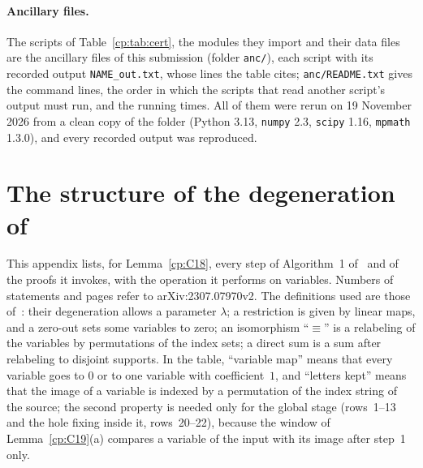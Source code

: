 \documentclass[11pt]{article}
\theoremstyle{definition}
\theoremstyle{remark}
\begin{document}
\paragraph{Ancillary files.} The scripts of Table~\ref{cp:tab:cert}, the modules they import and their data files are the ancillary files of this submission (folder \texttt{anc/}), each script with its recorded output \texttt{NAME\_\allowbreak{}out.\allowbreak{}txt}, whose lines the table cites; \texttt{anc/README.\allowbreak{}txt} gives the command lines, the order in which the scripts that read another script's output must run, and the running times. All of them were rerun on 19 November 2026 from a clean copy of the folder (Python 3.13, \texttt{numpy} 2.3, \texttt{scipy} 1.16, \texttt{mpmath} 1.3.0), and every recorded output was reproduced.

\appendix
\section{The structure of the degeneration of~\texorpdfstring{\cite{VXXZ24}}{VXXZ24}}\label{cp:app:vxxz}

This appendix lists, for Lemma~\ref{cp:C18}, every step of Algorithm~1 of~\cite{VXXZ24} and of the proofs it invokes, with the operation it performs on variables. Numbers of statements and pages refer to arXiv:2307.07970v2. The definitions used are those of~\cite[Sections~3.1 and~3.3]{VXXZ24}: their degeneration allows a parameter $\lambda$; a restriction is given by linear maps, and a zero-out sets some variables to zero; an isomorphism ``$\equiv$'' is a relabeling of the variables by permutations of the index sets; a direct sum is a sum after relabeling to disjoint supports. In the table, ``variable map'' means that every variable goes to $0$ or to one variable with coefficient~$1$, and ``letters kept'' means that the image of a variable is indexed by a permutation of the index string of the source; the second property is needed only for the global stage (rows~1--13 and the hole fixing inside it, rows~20--22), because the window of Lemma~\ref{cp:C19}(a) compares a variable of the input with its image after step~1 only.
\end{document}
